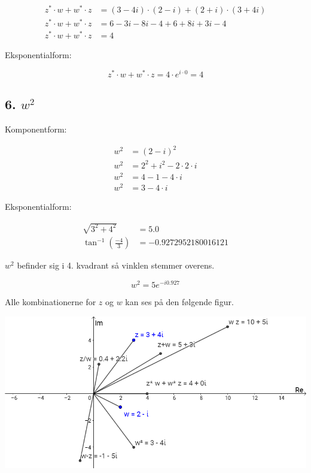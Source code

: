 \documentclass[a4paper, 12pt]{article}
\begin{document}
\begin{align*}
     z^* \cdot w + w^*\cdot z &= (3-4i) \cdot(2-i) + (2+i) \cdot(3+4i) \\
           z^* \cdot w + w^*\cdot z &= 6-3i -8i -4 +6+8i+3i-4 \\
           z^* \cdot w + w^*\cdot z &= 4
\end{align*}

Eksponentialform:

$$z^* \cdot w + w^* \cdot z = 4 \cdot e^{i \cdot 0}=4$$

\subsection*{6. \(w^2\)}
\label{sec:org46d0301}

Komponentform:

\begin{align*}
    w^2 &= (2-i)^2\\
    w^2 &= 2^2 + i^2 - 2 \cdot 2 \cdot i\\
    w^2 &= 4 - 1 - 4 \cdot i\\
    w^2 &= 3 - 4 \cdot i
\end{align*}

Eksponentialform:

\begin{align*}
\sqrt{3^2+4^2} &= 5.0 \\
\tan^{-1} \left( \frac{-4}{3} \right) &=- 0.9272952180016121
\end{align*}

\(w^2\) befinder sig i 4. kvadrant så vinklen stemmer overens.

$$w^2 = 5 e^{- i 0.927}$$

Alle kombinationerne for \(z\) og \(w\) kan ses på den følgende figur.

\begin{center}
\includegraphics[width=0.8\linewidth]{./img/opgave_1.png}
\end{center}
\end{document}
